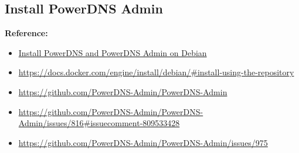 \documentclass[12pt]{article}
\newenvironment{mycolorbox}[1][gray]{
  \renewmdenv[
    linewidth=2pt, linecolor=#1, backgroundcolor=#1!10,
    topline=false, bottomline=false, rightline=false,
    skipabove=10pt, skipbelow=10pt, innerleftmargin=10pt,
    innerrightmargin=0pt, innertopmargin=5pt, innerbottommargin=5pt
  ]{myquote}
  \begin{myquote}
}{\end{myquote}}
\begin{document}
\subsection{Install PowerDNS Admin}
\begin{mycolorbox}[teal]
  \textbf{Reference:}
  \footnotesize
  \begin{itemize}
    \item \href{https://computingforgeeks.com/install-powerdns-and-powerdns-admin-on-debian/}{Install PowerDNS and PowerDNS Admin on Debian}
    \item \url{https://docs.docker.com/engine/install/debian/#install-using-the-repository}
    \item \url{https://github.com/PowerDNS-Admin/PowerDNS-Admin}
    \item \url{https://github.com/PowerDNS-Admin/PowerDNS-Admin/issues/816#issuecomment-809533428}
    \item \url{https://github.com/PowerDNS-Admin/PowerDNS-Admin/issues/975}
  \end{itemize}
\end{mycolorbox}
\end{document}
